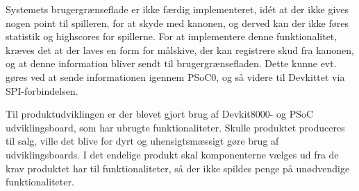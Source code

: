 Systemets brugergrænseflade er ikke færdig implementeret, idét at der ikke gives nogen point til spilleren, for at skyde med kanonen, og derved kan der ikke føres statistik og highscores for spillerne. For at implementere denne funktionalitet, kræves det at der laves en form for målskive, der kan registrere skud fra kanonen, og at denne information bliver sendt til brugergrænsefladen. Dette kunne evt. gøres ved at sende informationen igennem PSoC0, og så videre til Devkittet via SPI-forbindelsen.

Til produktudviklingen er der blevet gjort brug af Devkit8000- og PSoC udviklingsboard, som har ubrugte funktionaliteter. Skulle produktet produceres til salg, ville det blive for dyrt og uhensigtsmæssigt gøre brug af udviklingsboards. I det endelige produkt skal komponenterne vælges ud fra de krav produktet har til funktionaliteter, så der ikke spildes penge på unødvendige funktionaliteter.